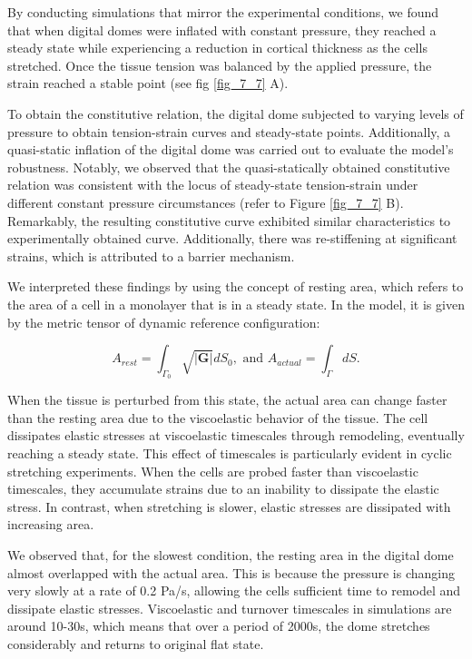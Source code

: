 By conducting simulations that mirror the experimental conditions, we found that when digital domes were inflated with constant pressure, they reached a steady state while experiencing a reduction in cortical thickness as the cells stretched. Once the tissue tension was balanced by the applied pressure, the strain reached a stable point (see fig \ref{fig_7_7} A).

To obtain the constitutive relation, the digital dome subjected to varying levels of pressure to obtain tension-strain curves and steady-state points. Additionally, a quasi-static inflation of the digital dome was carried out to evaluate the model's robustness. Notably, we observed that the quasi-statically obtained constitutive relation was consistent with the locus of steady-state tension-strain under different constant pressure circumstances (refer to Figure \ref{fig_7_7} B). Remarkably, the resulting constitutive curve exhibited similar characteristics to experimentally obtained curve. Additionally, there was re-stiffening at significant strains, which is attributed to a barrier mechanism.

We interpreted these findings by using the concept of resting area, which refers to the area of a cell in a monolayer that is in a steady state. In the model, it is given by the metric tensor of dynamic reference configuration:

\begin{equation}
	A_{rest} = \int_{\Gamma_0} \sqrt{|\mathbf{G}|}dS_0, \text{ and } A_{actual} = \int_{\Gamma}dS.
\end{equation}

When the tissue is perturbed from this state, the actual area can change faster than the resting area due to the viscoelastic behavior of the tissue. The cell dissipates elastic stresses at viscoelastic timescales through remodeling, eventually reaching a steady state. This effect of timescales is particularly evident in cyclic stretching experiments. When the cells are probed faster than viscoelastic timescales, they accumulate strains due to an inability to dissipate the elastic stress. In contrast, when stretching is slower, elastic stresses are dissipated with increasing area.

We observed that, for the slowest condition, the resting area in the digital dome almost overlapped with the actual area. This is because the pressure is changing very slowly at a rate of 0.2 Pa/s, allowing the cells sufficient time to remodel and dissipate elastic stresses. Viscoelastic and turnover timescales in simulations are around 10-30s, which means that over a period of 2000s, the dome stretches considerably and returns to original flat state.


